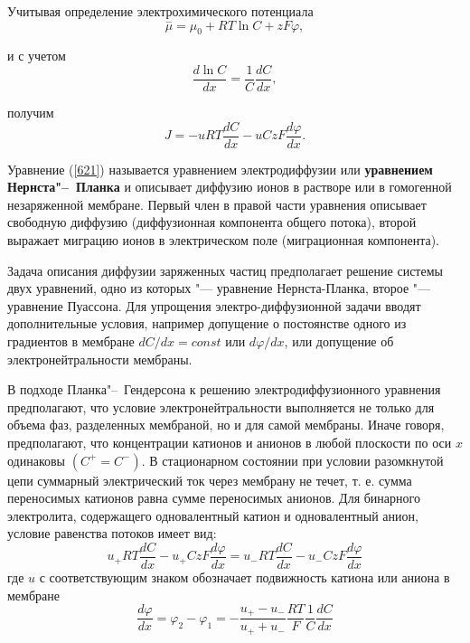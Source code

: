 \documentclass[12pt,a4paper,oneside]{book}
\begin{document}
Учитывая определение электрохимического потенциала
\begin{equation}
	\overset{-}{\mu}=\mu_0+RT \ln C+zF\varphi,
\end{equation}

и с учетом
\begin{equation}
	\frac{d\ln C}{dx}=\frac{1}{C} \frac{dC}{dx},
\end{equation}
 
получим 
\begin{equation}
	\label{621}
	J = -uRT \frac{dC}{dx} - uCzF \frac{d \varphi}{dx}.
\end{equation}
 
Уравнение (\ref{621}) называется уравнением электродиффузии или {\bf уравнением Нернста"--~Планка} и описывает диффузию ионов в растворе или в гомогенной незаряженной мембране. Первый член в правой части уравнения описывает свободную диффузию (диффузионная компонента общего потока), второй выражает миграцию ионов в электрическом поле (миграционная компонента).

Задача описания диффузии заряженных частиц предполагает решение системы двух уравнений, одно из которых "--- уравнение Нернста-Планка, второе "--- уравнение Пуассона. Для упрощения электро-диффузионной задачи вводят дополнительные условия, например допущение о постоянстве одного из градиентов в мембране $dC/dx=const$ или $d \varphi/dx$, или допущение об электронейтральности мембраны. 

В подходе Планка"--~Гендерсона к решению электродиффузионного уравнения предполагают, что условие электронейтральности выполняется не только для объема фаз, разделенных мембраной, но и для самой мембраны. Иначе говоря, предполагают, что концентрации катионов и анионов в любой плоскости по оси $x$ одинаковы $(C^+ = C^-)$. В стационарном состоянии при условии разомкнутой цепи суммарный электрический ток через мембрану не течет, т. е. сумма переносимых катионов равна сумме переносимых анионов. Для бинарного электролита, содержащего одновалентный катион и одновалентный анион, условие равенства потоков имеет вид:
\begin{equation}
	u_+RT \frac{dC}{dx}-u_+CzF \frac{d \varphi}{dx} = 
		u_-RT \frac{dC}{dx}-u_-CzF \frac{d \varphi}{dx}
\end{equation}
где $u$ с соответствующим знаком обозначает подвижность катиона или аниона в мембране
\begin{equation}
	\frac{d \varphi}{dx} = \varphi_2-\varphi_1 = 
		-\frac{u_+-u_-}{u_++u_-} \frac{RT}{F} \frac{1}{C}\frac{dC}{dx}
\end{equation}
\end{document}
